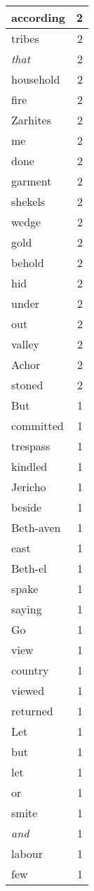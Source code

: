 \begin{center}
\begin{longtable}{l|r}
according & 2\\ \hline 
tribes & 2\\ \hline 
\emph{that} & 2\\ \hline 
household & 2\\ \hline 
fire & 2\\ \hline 
Zarhites & 2\\ \hline 
me & 2\\ \hline 
done & 2\\ \hline 
garment & 2\\ \hline 
shekels & 2\\ \hline 
wedge & 2\\ \hline 
gold & 2\\ \hline 
behold & 2\\ \hline 
hid & 2\\ \hline 
under & 2\\ \hline 
out & 2\\ \hline 
valley & 2\\ \hline 
Achor & 2\\ \hline 
stoned & 2\\ \hline 
But & 1\\ \hline 
committed & 1\\ \hline 
trespass & 1\\ \hline 
kindled & 1\\ \hline 
Jericho & 1\\ \hline 
beside & 1\\ \hline 
Beth-aven & 1\\ \hline 
east & 1\\ \hline 
Beth-el & 1\\ \hline 
spake & 1\\ \hline 
saying & 1\\ \hline 
Go & 1\\ \hline 
view & 1\\ \hline 
country & 1\\ \hline 
viewed & 1\\ \hline 
returned & 1\\ \hline 
Let & 1\\ \hline 
but & 1\\ \hline 
let & 1\\ \hline 
or & 1\\ \hline 
smite & 1\\ \hline 
\emph{and} & 1\\ \hline 
labour & 1\\ \hline 
few & 1\\ \hline 

\end{longtable}
\end{center}
